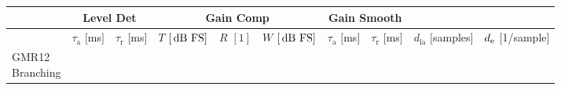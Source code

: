 \documentclass[../main2.tex]{subfiles}
\begin{document}
\begin{tabular}{| l | c c | c c c | c c | c | c |}
	\hline
		&
		\multicolumn{2}{c|}{Level Det} &
		\multicolumn{3}{c|}{Gain Comp} & 
		\multicolumn{2}{c|}{Gain Smooth} &
		&\\
	\hline
		&
		\tblbox{$\tau_\text{a}$\\ $[$ms$]$} &
		\tblbox{$\tau_\text{r}$\\ $[$ms$]$} &
		\tblbox{$T$\\ $[ \mskip3mu\text{dB FS} ]$} &
		\tblbox{$R$\\ $[1]$} &
		\tblbox{$W$\\ $[ \mskip3mu\text{dB FS} ]$} &
		\tblbox{$\tau_\text{a}$\\ $[$ms$]$} &
		\tblbox{$\tau_\text{r}$\\ $[$ms$]$} &
		\tblbox{$d_\text{la}$\\ $[$samples$]$} &
		\tblbox{$d_\text{e}$\\ $[$1/sample$]$} \\
	\hline
		\tblbox{GMR12\\Branching} &
		&
		&
		&
		&
		&
		&
		&
		&
		\\
\end{tabular}
\end{document}
